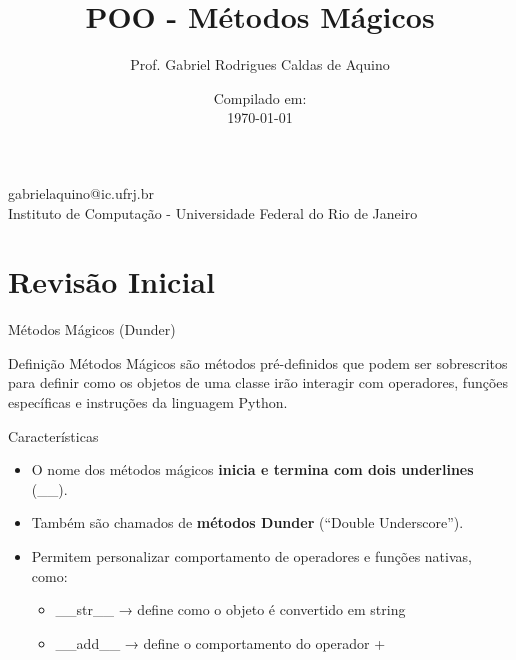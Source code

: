 \title{POO - Métodos Mágicos}

\author{Prof. Gabriel Rodrigues Caldas de Aquino}

\institute
{
    gabrielaquino@ic.ufrj.br\\

    Instituto de Computação -
    Universidade Federal do Rio de Janeiro %
}
\date{Compilado em: \\ \today} %


\section{Revisão Inicial}

\begin{frame}
    \titlepage
\end{frame}

\begin{frame}{Métodos Mágicos (Dunder)}

    \begin{block}{Definição}
        Métodos Mágicos são métodos pré-definidos que podem ser sobrescritos para definir como os objetos de uma classe irão interagir com operadores, funções específicas e instruções da linguagem Python.
    \end{block}

    \begin{block}{Características}
        \begin{itemize}
            \item O nome dos métodos mágicos \textbf{inicia e termina com dois underlines} (\_\_).
            \item Também são chamados de \textbf{métodos Dunder} (“Double Underscore”).
            \item Permitem personalizar comportamento de operadores e funções nativas, como:
                  \begin{itemize}
                      \item \_\_str\_\_ → define como o objeto é convertido em string
                      \item \_\_add\_\_ → define o comportamento do operador +
                  \end{itemize}
        \end{itemize}
    \end{block}

\end{frame}

